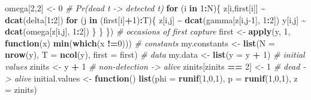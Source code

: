 \documentclass[
  12pt,
]{krantz}
\newenvironment{Shaded}{\begin{snugshade}}{\end{snugshade}}
\newcommand{\AttributeTok}[1]{\textcolor[rgb]{0.13,0.29,0.53}{#1}}
\newcommand{\CommentTok}[1]{\textcolor[rgb]{0.56,0.35,0.01}{\textit{#1}}}
\newcommand{\ControlFlowTok}[1]{\textcolor[rgb]{0.13,0.29,0.53}{\textbf{#1}}}
\newcommand{\DecValTok}[1]{\textcolor[rgb]{0.00,0.00,0.81}{#1}}
\newcommand{\FunctionTok}[1]{\textcolor[rgb]{0.13,0.29,0.53}{\textbf{#1}}}
\newcommand{\NormalTok}[1]{#1}
\newcommand{\OtherTok}[1]{\textcolor[rgb]{0.56,0.35,0.01}{#1}}
\newcommand{\SpecialCharTok}[1]{\textcolor[rgb]{0.81,0.36,0.00}{\textbf{#1}}}
\begin{document}
\begin{Shaded}
\begin{Highlighting}[]
\NormalTok{  omega[}\DecValTok{2}\NormalTok{,}\DecValTok{2}\NormalTok{] }\OtherTok{\textless{}{-}} \DecValTok{0}        \CommentTok{\# Pr(dead t {-}\textgreater{} detected t)}
  \ControlFlowTok{for}\NormalTok{ (i }\ControlFlowTok{in} \DecValTok{1}\SpecialCharTok{:}\NormalTok{N)\{}
\NormalTok{    z[i,first[i]] }\SpecialCharTok{\textasciitilde{}} \FunctionTok{dcat}\NormalTok{(delta[}\DecValTok{1}\SpecialCharTok{:}\DecValTok{2}\NormalTok{])}
    \ControlFlowTok{for}\NormalTok{ (j }\ControlFlowTok{in}\NormalTok{ (first[i]}\SpecialCharTok{+}\DecValTok{1}\NormalTok{)}\SpecialCharTok{:}\NormalTok{T)\{}
\NormalTok{      z[i,j] }\SpecialCharTok{\textasciitilde{}} \FunctionTok{dcat}\NormalTok{(gamma[z[i,j}\DecValTok{{-}1}\NormalTok{], }\DecValTok{1}\SpecialCharTok{:}\DecValTok{2}\NormalTok{])}
\NormalTok{      y[i,j] }\SpecialCharTok{\textasciitilde{}} \FunctionTok{dcat}\NormalTok{(omega[z[i,j], }\DecValTok{1}\SpecialCharTok{:}\DecValTok{2}\NormalTok{])}
\NormalTok{    \}}
\NormalTok{  \}}
\NormalTok{\})}
\CommentTok{\# occasions of first capture}
\NormalTok{first }\OtherTok{\textless{}{-}} \FunctionTok{apply}\NormalTok{(y, }\DecValTok{1}\NormalTok{, }\ControlFlowTok{function}\NormalTok{(x) }\FunctionTok{min}\NormalTok{(}\FunctionTok{which}\NormalTok{(x }\SpecialCharTok{!=}\DecValTok{0}\NormalTok{)))}
\CommentTok{\# constants}
\NormalTok{my.constants }\OtherTok{\textless{}{-}} \FunctionTok{list}\NormalTok{(}\AttributeTok{N =} \FunctionTok{nrow}\NormalTok{(y), }
                     \AttributeTok{T =} \FunctionTok{ncol}\NormalTok{(y), }
                     \AttributeTok{first =}\NormalTok{ first)}
\CommentTok{\# data}
\NormalTok{my.data }\OtherTok{\textless{}{-}} \FunctionTok{list}\NormalTok{(}\AttributeTok{y =}\NormalTok{ y }\SpecialCharTok{+} \DecValTok{1}\NormalTok{)}
\CommentTok{\# initial values}
\NormalTok{zinits }\OtherTok{\textless{}{-}}\NormalTok{ y }\SpecialCharTok{+} \DecValTok{1} \CommentTok{\# non{-}detection {-}\textgreater{} alive}
\NormalTok{zinits[zinits }\SpecialCharTok{==} \DecValTok{2}\NormalTok{] }\OtherTok{\textless{}{-}} \DecValTok{1} \CommentTok{\# dead {-}\textgreater{} alive}
\NormalTok{initial.values }\OtherTok{\textless{}{-}} \ControlFlowTok{function}\NormalTok{() }\FunctionTok{list}\NormalTok{(}\AttributeTok{phi =} \FunctionTok{runif}\NormalTok{(}\DecValTok{1}\NormalTok{,}\DecValTok{0}\NormalTok{,}\DecValTok{1}\NormalTok{),}
                                  \AttributeTok{p =} \FunctionTok{runif}\NormalTok{(}\DecValTok{1}\NormalTok{,}\DecValTok{0}\NormalTok{,}\DecValTok{1}\NormalTok{),}
                                  \AttributeTok{z =}\NormalTok{ zinits)}

\end{Highlighting}
\end{Shaded}
\end{document}
